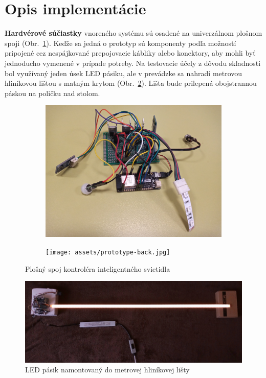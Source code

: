 \documentclass[12pt, a4paper]{article}
\begin{document}
\section{Opis implementácie}
\textbf{Hardvérové súčiastky} vnoreného systému sú osadené na univerzálnom plošnom spoji (Obr.~\ref{fig:pcb}). Keďže sa jedná o prototyp sú komponenty podľa možností pripojené cez nespájkované prepojovacie kábliky alebo konektory, aby mohli byť jednoducho vymenené v prípade potreby. Na testovacie účely z dôvodu skladnosti bol využívaný jeden úsek LED pásiku, ale v prevádzke sa nahradí metrovou hliníkovou lištou s matným krytom (Obr.~\ref{fig:lamp-full}). Lišta bude prilepená obojstrannou páskou na poličku nad stolom.

\begin{figure}[h]
\centering
\begin{subfigure}[b]{0.48\textwidth}
	\centering
	\includegraphics[width=\textwidth]{assets/prototype.jpg}
\end{subfigure}
\hfill
\begin{subfigure}[b]{0.48\textwidth}
	\centering
	\texttt{[image: assets/prototype-back.jpg]}
\end{subfigure}
\caption{Plošný spoj kontroléra inteligentného svietidla}
\label{fig:pcb}
\end{figure}

\begin{figure}
\includegraphics[width=\textwidth]{assets/lamp.jpg}
\caption{LED pásik namontovaný do metrovej hliníkovej lišty}
\label{fig:lamp-full}
\end{figure}
\end{document}
